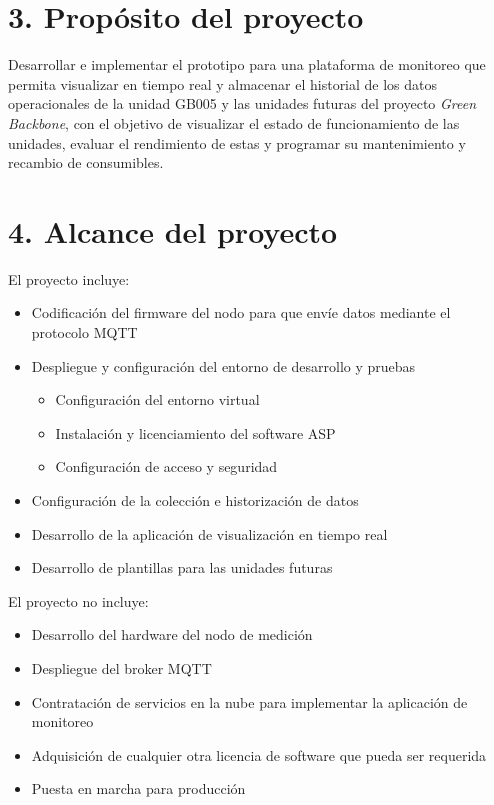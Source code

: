 \documentclass[
11pt, %
]{charter}
\begin{document}
\section{3. Propósito del proyecto}
\label{sec:proposito}

Desarrollar e implementar el prototipo para una plataforma de monitoreo que permita visualizar en tiempo real y almacenar el historial de los datos operacionales de la unidad GB005 y las unidades futuras del proyecto \textit{Green Backbone}, con el objetivo de visualizar el estado de funcionamiento de las unidades, evaluar el rendimiento de estas y programar su mantenimiento y recambio de consumibles.

\section{4. Alcance del proyecto}
\label{sec:alcance}
El proyecto incluye:
\begin{itemize}
	\item Codificación del firmware del nodo para que envíe datos mediante el protocolo MQTT
	\item Despliegue y configuración del entorno de desarrollo y pruebas
		\begin{itemize}
		\item Configuración del entorno virtual
		\item Instalación y licenciamiento del software ASP
		\item Configuración de acceso y seguridad
		\end{itemize}
	\item Configuración de la colección e historización de datos
	\item Desarrollo de la aplicación de visualización en tiempo real
	\item Desarrollo de plantillas para las unidades futuras
	
\end{itemize}

El proyecto no incluye:
\begin{itemize}
	\item Desarrollo del hardware del nodo de medición
	\item Despliegue del broker MQTT
	\item Contratación de servicios en la nube para implementar la aplicación de monitoreo
	\item Adquisición de cualquier otra licencia de software que pueda ser requerida
	\item Puesta en marcha para producción
	
\end{itemize}
\end{document}
